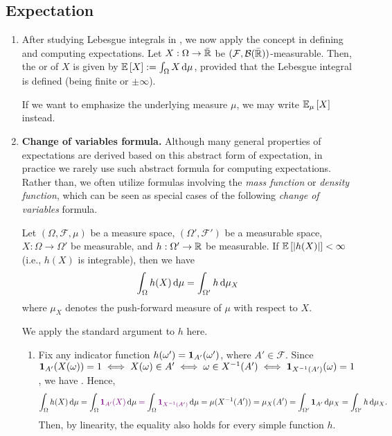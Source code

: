 \subsection{Expectation}
\label{subsect:expectation}
\begin{enumerate}
\item After studying Lebesgue integrals in
, we now apply the concept in defining and
computing expectations. Let \(X:\Omega\to\bar{\mathbb{R}}\) be
\((\mathcal{F},\mathcal{B}(\bar{\mathbb{R}}))\)-measurable. Then, the
 or  of \(X\) is given by \(\expv{X}:=\int_{\Omega}^{}X\odif{\mu}\),
provided that the Lebesgue integral is defined (being finite or \(\pm\infty\)).
\begin{note}
If we want to emphasize the underlying measure \(\mu\), we may write
\(\mathbb{E}_{\mu}\left[X\right]\) instead.
\end{note}

\item \textbf{Change of variables formula.} Although many general properties of
expectations are derived based on this abstract form of expectation, in
practice we rarely use such abstract formula for computing expectations. Rather
than, we often utilize formulas involving the \emph{mass function} or
\emph{density function}, which can be seen as special cases of the
following \emph{change of variables} formula.

\begin{theorem}
\label{thm:change-of-var}
Let \((\Omega,\mathcal{F},\mu)\) be a measure space, \((\Omega',\mathcal{F}')\)
be a measurable space, \(X:\Omega\to\Omega'\) be measurable, and
\(h:\Omega'\to\mathbb{R}\) be measurable. If \(\mathbb{E}\left[|h(X)|\right]<\infty\) (i.e., \(h(X)\)
is integrable), then we have
\[
\int_{\Omega}^{}h(X)\odif{\mu}=\int_{\Omega'}^{}h\odif{\mu_{X}}
\]
where \(\mu_X\) denotes the push-forward measure of \(\mu\) with respect to \(X\).
\end{theorem}
\begin{pf}
We apply the standard argument to \(h\) here.
\begin{enumerate}[label={(\arabic*)}]
\item Fix any indicator function \(h(\omega')=\mathbf{1}_{A'}(\omega')\),
where \(A'\in\mathcal{F}\). Since \(\mathbf{1}_{A'}(X(\omega))=1\iff X(\omega)\in
A'\iff \omega\in X^{-1}(A')\iff \mathbf{1}_{X^{-1}(A')}(\omega)=1\), we have
. Hence,
\[
\int_{\Omega}^{}h(X)\odif{\mu}
=\int_{\Omega}^{}\vc{\indic_{A'}(X)}\odif{\mu}
\vc{=}\int_{\Omega}^{}\vc{\indic_{X^{-1}(A')}}\odif{\mu}
=\mu(X^{-1}(A'))
=\mu_X(A')
=\int_{\Omega'}^{}\indic_{A'}\odif{\mu_X}
=\int_{\Omega'}^{}h\odif{\mu_X}.
\]
Then, by linearity, the equality also holds for every simple function \(h\).


\end{enumerate}
\end{pf}
\end{enumerate}
